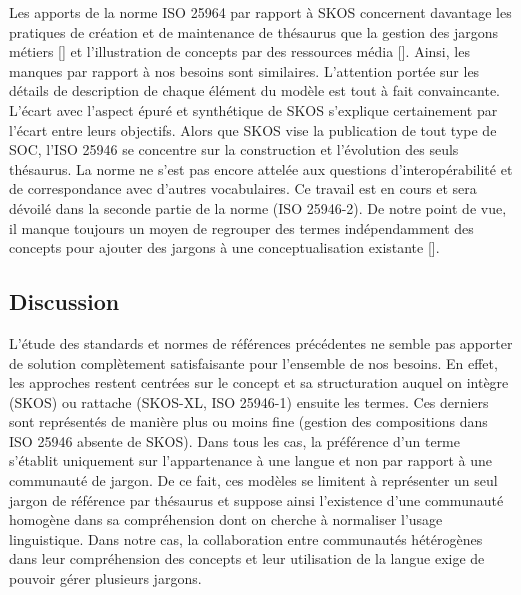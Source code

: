 Les apports de la norme ISO 25964 par rapport à SKOS concernent davantage les pratiques de création et de maintenance de thésaurus que la gestion des jargons métiers [] et l'illustration de concepts par des ressources média []. 
Ainsi, les manques par rapport à nos besoins sont similaires. L'attention portée sur les détails de description de chaque élément du modèle est tout à fait convaincante. 
L'écart avec l'aspect épuré et synthétique de SKOS s'explique certainement par l'écart entre leurs objectifs. 
Alors que SKOS vise la publication de tout type de SOC, l'ISO 25946 se concentre sur la construction et l'évolution des seuls thésaurus. 
La norme ne s'est pas encore attelée aux questions d'interopérabilité et de correspondance avec d'autres vocabulaires. Ce travail est en cours et sera dévoilé dans la seconde partie de la norme (ISO 25946-2). 
De notre point de vue, il manque toujours un moyen de regrouper des termes indépendamment des concepts pour ajouter des jargons à une conceptualisation existante [].





\subsection*{Discussion}

L'étude des standards et normes de références précédentes ne semble pas apporter de solution complètement satisfaisante pour l'ensemble de nos besoins. 
En effet, les approches restent centrées sur le concept et sa structuration auquel on intègre (SKOS) ou rattache (SKOS-XL, ISO 25946-1) ensuite les termes. 
Ces derniers sont représentés de manière plus ou moins fine (gestion des compositions dans ISO 25946 absente de SKOS). 
Dans tous les cas, la préférence d'un terme s'établit uniquement sur l'appartenance à une langue et non par rapport à une communauté de jargon. %
De ce fait, ces modèles se limitent à représenter un seul jargon de référence par thésaurus et suppose ainsi l'existence d'une communauté homogène dans sa compréhension dont on cherche à normaliser l'usage linguistique. %
Dans notre cas, la collaboration entre communautés hétérogènes dans leur compréhension des concepts et leur utilisation de la langue exige de pouvoir gérer plusieurs jargons. 

